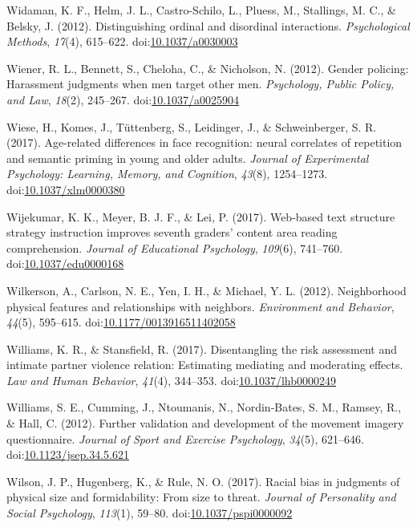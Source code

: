 \documentclass[english,man]{apa6}
\theoremstyle{definition}
\theoremstyle{definition}
\theoremstyle{definition}
\theoremstyle{remark}
\begin{document}
\hypertarget{ref-Widaman2012}{}
Widaman, K. F., Helm, J. L., Castro-Schilo, L., Pluess, M., Stallings,
M. C., \& Belsky, J. (2012). Distinguishing ordinal and disordinal
interactions. \emph{Psychological Methods}, \emph{17}(4), 615--622.
doi:\href{https://doi.org/10.1037/a0030003}{10.1037/a0030003}

\hypertarget{ref-Wiener2012}{}
Wiener, R. L., Bennett, S., Cheloha, C., \& Nicholson, N. (2012). Gender
policing: Harassment judgments when men target other men.
\emph{Psychology, Public Policy, and Law}, \emph{18}(2), 245--267.
doi:\href{https://doi.org/10.1037/a0025904}{10.1037/a0025904}

\hypertarget{ref-Wiese2017}{}
Wiese, H., Komes, J., Tüttenberg, S., Leidinger, J., \& Schweinberger,
S. R. (2017). Age-related differences in face recognition: neural
correlates of repetition and semantic priming in young and older adults.
\emph{Journal of Experimental Psychology: Learning, Memory, and
Cognition}, \emph{43}(8), 1254--1273.
doi:\href{https://doi.org/10.1037/xlm0000380}{10.1037/xlm0000380}

\hypertarget{ref-Wijekumar2017}{}
Wijekumar, K. K., Meyer, B. J. F., \& Lei, P. (2017). Web-based text
structure strategy instruction improves seventh graders' content area
reading comprehension. \emph{Journal of Educational Psychology},
\emph{109}(6), 741--760.
doi:\href{https://doi.org/10.1037/edu0000168}{10.1037/edu0000168}

\hypertarget{ref-Wilkerson2012}{}
Wilkerson, A., Carlson, N. E., Yen, I. H., \& Michael, Y. L. (2012).
Neighborhood physical features and relationships with neighbors.
\emph{Environment and Behavior}, \emph{44}(5), 595--615.
doi:\href{https://doi.org/10.1177/0013916511402058}{10.1177/0013916511402058}

\hypertarget{ref-Williams2017}{}
Williams, K. R., \& Stansfield, R. (2017). Disentangling the risk
assessment and intimate partner violence relation: Estimating mediating
and moderating effects. \emph{Law and Human Behavior}, \emph{41}(4),
344--353.
doi:\href{https://doi.org/10.1037/lhb0000249}{10.1037/lhb0000249}

\hypertarget{ref-Williams2012}{}
Williams, S. E., Cumming, J., Ntoumanis, N., Nordin-Bates, S. M.,
Ramsey, R., \& Hall, C. (2012). Further validation and development of
the movement imagery questionnaire. \emph{Journal of Sport and Exercise
Psychology}, \emph{34}(5), 621--646.
doi:\href{https://doi.org/10.1123/jsep.34.5.621}{10.1123/jsep.34.5.621}

\hypertarget{ref-Wilson2017}{}
Wilson, J. P., Hugenberg, K., \& Rule, N. O. (2017). Racial bias in
judgments of physical size and formidability: From size to threat.
\emph{Journal of Personality and Social Psychology}, \emph{113}(1),
59--80.
doi:\href{https://doi.org/10.1037/pspi0000092}{10.1037/pspi0000092}
\end{document}
